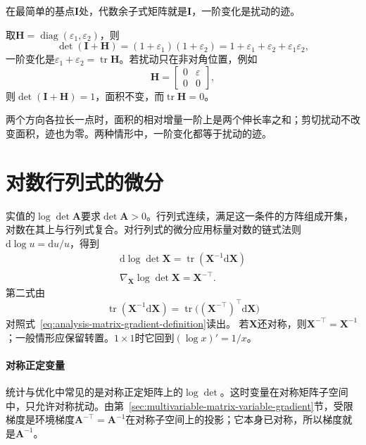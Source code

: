 在最简单的基点$\bm I$处，代数余子式矩阵就是$\bm I$，一阶变化是扰动的迹。
\begin{example}[单位矩阵附近行列式的一阶变化]
\label{ex:multivariable-determinant-near-identity}
取$\bm H=\operatorname{diag}(\varepsilon_1,\varepsilon_2)$，则
\[
 \det(\bm I+\bm H)=(1+\varepsilon_1)(1+\varepsilon_2)=1+\varepsilon_1+\varepsilon_2+\varepsilon_1\varepsilon_2,
\]
一阶变化是$\varepsilon_1+\varepsilon_2=\operatorname{tr}\bm H$。若扰动只在非对角位置，例如
\[
 \bm H=\begin{bmatrix}0&\varepsilon\\0&0\end{bmatrix},
\]
则$\det(\bm I+\bm H)=1$，面积不变，而$\operatorname{tr}\bm H=0$。
\end{example}

两个方向各拉长一点时，面积的相对增量一阶上是两个伸长率之和；剪切扰动不改变面积，迹也为零。两种情形中，一阶变化都等于扰动的迹。

\section{对数行列式的微分}
\label{sec:multivariable-logdet-differential}

实值的$\log\det\bm A$要求$\det\bm A>0$。行列式连续，满足这一条件的方阵组成开集，对数在其上与行列式复合。对行列式的微分应用标量对数的链式法则$\mathrm d\log u=\mathrm du/u$，得到
\begin{equation}
\begin{gathered}
\mathrm{d}\log\det\bm{X}
  =
  \operatorname{tr}(\bm{X}^{-1}\mathrm{d}\bm{X})\\
\nabla_{\bm{X}}\log\det\bm{X}
  =
  \bm{X}^{-\top}.
\end{gathered}
\label{eq:analysis-logdet-gradient}
\end{equation}
第二式由
\[
 \operatorname{tr}(\bm X^{-1}\mathrm d\bm X)=\operatorname{tr}\bigl((\bm X^{-\top})^\top\mathrm d\bm X\bigr)
\]
对照式~\eqref{eq:analysis-matrix-gradient-definition}读出。
若$\bm X$还对称，则$\bm{X}^{-\top}=\bm{X}^{-1}$；一般情形应保留转置。$1\times1$时它回到$(\log x)'=1/x$。

\paragraph{对称正定变量}
统计与优化中常见的是对称正定矩阵上的$\log\det$。这时变量在对称矩阵子空间中，只允许对称扰动。由第~\ref{sec:multivariable-matrix-variable-gradient}节，受限梯度是环境梯度$\bm A^{-\top}=\bm A^{-1}$在对称子空间上的投影；它本身已对称，所以梯度就是$\bm A^{-1}$。

